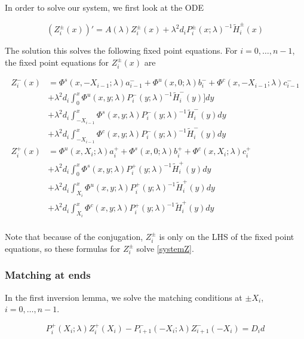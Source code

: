 \documentclass[12pt]{article}
\begin{document}
In order to solve our system, we first look at the ODE

\[
(Z_i^\pm(x))' = A(\lambda) Z_i^\pm(x) + \lambda^2 d_i P_i^\pm(x; \lambda)^{-1} \tilde{H}_i^\pm(x)
\]

The solution this solves the following fixed point equations. For $i = 0, \dots, n-1$, the fixed point equations for $Z_i^\pm(x)$ are

\begin{align*}
Z_i^-(x) &= \Phi^s(x, -X_{i-1}; \lambda) a_{i-1}^- + \Phi^u(x, 0; \lambda) b_i^- + \Phi^c(x, -X_{i-1}; \lambda) c_{i-1}^- \\
&+ \lambda^2 d_i \int_0^x \Phi^u(x, y; \lambda) P_i^-(y; \lambda)^{-1} \tilde{H}_i^-(y)] dy \\
&+ \lambda^2 d_i \int_{-X_{i-1}}^x \Phi^s(x, y; \lambda) P_i^-(y; \lambda)^{-1} \tilde{H}_i^-(y) dy \\
&+ \lambda^2 d_i \int_{-X_{i-1}}^x \Phi^c(x, y; \lambda) P_i^-(y; \lambda)^{-1} \tilde{H}_i^-(y) dy  \\ 
Z_i^+(x) &= \Phi^u(x, X_i; \lambda) a_i^+ + \Phi^s(x, 0; \lambda) b_i^+ + \Phi^c(x, X_i; \lambda) c_i^+ \\
&+ \lambda^2 d_i \int_0^x \Phi^s(x, y; \lambda) P_i^+(y; \lambda)^{-1} \tilde{H}_i^+(y) dy \\
&+ \lambda^2 d_i \int_{X_i}^x \Phi^u(x, y; \lambda) P_i^+(y; \lambda)^{-1} \tilde{H}_i^+(y) dy \\
&+ \lambda^2 d_i \int_{X_i}^x \Phi^c(x, y; \lambda) P_i^+(y; \lambda)^{-1} \tilde{H}_i^+(y) dy \\
\end{align*}

Note that because of the conjugation, $Z_i^\pm$ is only on the LHS of the fixed point equations, so these formulas for $Z_i^\pm$ solve \eqref{systemZ}.


\subsubsection{Matching at ends}

In the first inversion lemma, we solve the matching conditions at $\pm X_i$, $i = 0, \dots, n-1$.

\[
P_i^+(X_i; \lambda) Z_i^+(X_i) - P_{i+1}^-(-X_i; \lambda) Z_{i+1}^-(-X_i) = D_i d
\]

\end{document}
